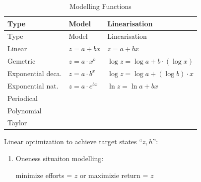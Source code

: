\documentclass[
  letterpaper,
  DIV=11,
  numbers=noendperiod]{scrartcl}
\begin{document}
\begin{longtable}[]{@{}
  >{\raggedright\arraybackslash}p{}
  >{\raggedright\arraybackslash}p{}
  >{\raggedright\arraybackslash}p{}@{}}
\caption{Modelling Functions}\label{tbl-modeling}\tabularnewline
\toprule\noalign{}
\begin{minipage}[b]{\linewidth}\raggedright
Type
\end{minipage} & \begin{minipage}[b]{\linewidth}\raggedright
Model
\end{minipage} & \begin{minipage}[b]{\linewidth}\raggedright
Linearisation
\end{minipage} \\
\midrule\noalign{}
\endfirsthead
\toprule\noalign{}
\begin{minipage}[b]{\linewidth}\raggedright
Type
\end{minipage} & \begin{minipage}[b]{\linewidth}\raggedright
Model
\end{minipage} & \begin{minipage}[b]{\linewidth}\raggedright
Linearisation
\end{minipage} \\
\midrule\noalign{}
\endhead
\bottomrule\noalign{}
\endlastfoot
Linear & \(z = a + bx\) & \(z = a + bx\) \\
Gemetric & \(z = a \cdot x^b\) &
\(\log z = \log a + b \cdot (\log x)\) \\
Exponential deca. & \(z = a \cdot b^x\) &
\(\log z = \log a + (\log b) \cdot x\) \\
Exponential nat. & \(z = a \cdot e^{bx}\) & \(\ln z = \ln a + bx\) \\
Periodical & & \\
Polynomial & & \\
Taylor & & \\
\end{longtable}

\hfill\break
\hfill\break
Linear optimization to achieve target states ``\(z, h\)'':

\begin{enumerate}
\def\labelenumi{\arabic{enumi}.}
\item
  Oneness situaiton modelling:

  minimize efforts = \(z\) or maximizie return = \(z\)
\end{enumerate}
\end{document}
